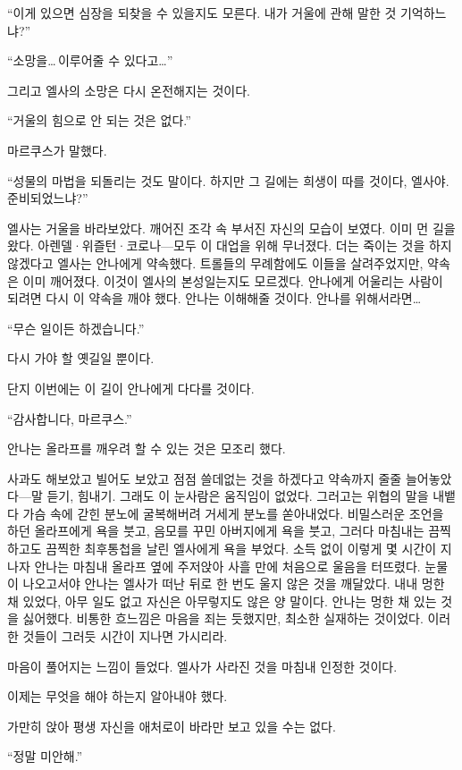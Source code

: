 ``이게 있으면 심장을 되찾을 수 있을지도 모른다. 내가 거울에 관해 말한 것 기억하느냐?''

``소망을\ldots\,이루어줄 수 있다고\ldots''

그리고 엘사의 소망은 다시 온전해지는 것이다.

``거울의 힘으로 안 되는 것은 없다.''

마르쿠스가 말했다.

``성물의 마법을 되돌리는 것도 말이다. 하지만 그 길에는 희생이 따를 것이다, 엘사야. 준비되었느냐?''

엘사는 거울을 바라보았다. 깨어진 조각 속 부서진 자신의 모습이 보였다. 이미 먼 길을 왔다. 아렌델·위즐턴·코로나—모두 이 대업을 위해 무너졌다. 더는 죽이는 것을 하지 않겠다고 엘사는 안나에게 약속했다. 트롤들의 무례함에도 이들을 살려주었지만, 약속은 이미 깨어졌다. 이것이 엘사의 본성일는지도 모르겠다. 안나에게 어울리는 사람이 되려면 다시 이 약속을 깨야 했다. 안나는 이해해줄 것이다. 안나를 위해서라면\ldots

``무슨 일이든 하겠습니다.''

다시 가야 할 옛길일 뿐이다.

단지 이번에는 이 길이 안나에게 다다를 것이다.

``감사합니다, 마르쿠스.''

\textbreak

안나는 올라프를 깨우려 할 수 있는 것은 모조리 했다.

사과도 해보았고 빌어도 보았고 점점 쓸데없는 것을 하겠다고 약속까지 줄줄 늘어놓았다—말 듣기, 힘내기. 그래도 이 눈사람은 움직임이 없었다. 그러고는 위협의 말을 내뱉다 가슴 속에 갇힌 분노에 굴복해버려 거세게 분노를 쏟아내었다. 비밀스러운 조언을 하던 올라프에게 욕을 붓고, 음모를 꾸민 아버지에게 욕을 붓고, 그러다 마침내는 끔찍하고도 끔찍한 최후통첩을 날린 엘사에게 욕을 부었다. 소득 없이 이렇게 몇 시간이 지나자 안나는 마침내 올라프 옆에 주저앉아 사흘 만에 처음으로 울음을 터뜨렸다. 눈물이 나오고서야 안나는 엘사가 떠난 뒤로 한 번도 울지 않은 것을 깨달았다. 내내 멍한 채 있었다, 아무 일도 없고 자신은 아무렇지도 않은 양 말이다. 안나는 멍한 채 있는 것을 싫어했다. 비통한 흐느낌은 마음을 죄는 듯했지만, 최소한 실재하는 것이었다. 이러한 것들이 그러듯 시간이 지나면 가시리라.

마음이 풀어지는 느낌이 들었다. 엘사가 사라진 것을 마침내 인정한 것이다.

이제는 무엇을 해야 하는지 알아내야 했다.

가만히 앉아 평생 자신을 애처로이 바라만 보고 있을 수는 없다.

``정말 미안해.''

